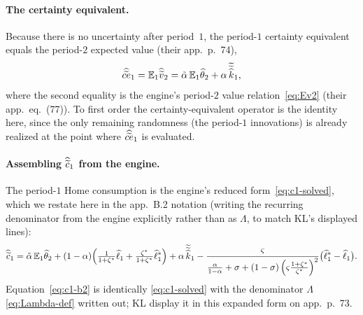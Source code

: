 \paragraph{The certainty equivalent.} Because there is no uncertainty after
period~$1$, the period-$1$ certainty equivalent equals the period-$2$ expected
value (their app.~p.~74),
\begin{equation}
\widehat{\widetilde{ce}}_1 = \mathbb{E}_1\widehat{\widetilde{v}}_2 = \tilde{\alpha}\,\mathbb{E}_1\widehat{\theta}_2 + \alpha\,\widetilde{\widetilde{\widehat{k}}}_1, \label{eq:ce1}
\end{equation}
where the second equality is the engine's period-$2$ value
relation~\eqref{eq:Ev2} (their app.~eq.~(77)). To first order the
certainty-equivalent operator is the identity here, since the only remaining
randomness (the period-$1$ innovations) is already realized at the point where
$\widehat{\widetilde{ce}}_1$ is evaluated.

\paragraph{Assembling $\widehat{\widetilde{c}}_1$ from the engine.} The period-$1$ Home
consumption is the engine's reduced form~\eqref{eq:c1-solved}, which we restate
here in the app.~B.2 notation (writing the recurring denominator from the engine
explicitly rather than as $\Lambda$, to match KL's displayed lines):
\begin{equation}
\widehat{\widetilde{c}}_1 = \tilde{\alpha}\,\mathbb{E}_1\widehat{\theta}_2
+(1-\alpha)\Bigl(\tfrac{1}{1+\zeta^{*}}\widehat{\ell}_1+\tfrac{\zeta^{*}}{1+\zeta^{*}}\widehat{\ell}^{*}_1\Bigr)
+\alpha\,\widetilde{\widetilde{\widehat{k}}}_1
-\frac{\varsigma}{\frac{\alpha}{1-\alpha}+\sigma+(1-\sigma)\left(\varsigma\frac{1+\zeta^{*}}{\zeta^{*}}\right)^2}\bigl(\widehat{\ell}^{*}_1-\widehat{\ell}_1\bigr). \label{eq:c1-b2}
\end{equation}
Equation~\eqref{eq:c1-b2} is identically \eqref{eq:c1-solved} with the
denominator $\Lambda$ \eqref{eq:Lambda-def} written out; KL display it in this
expanded form on app.~p.~73.

